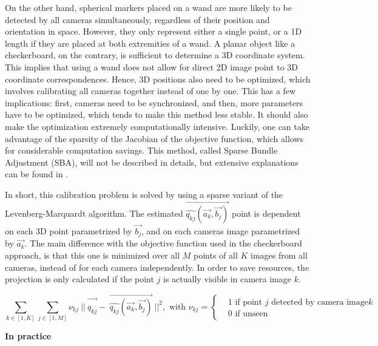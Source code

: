 On the other hand, spherical markers placed on a wand are more likely to be detected by all cameras simultaneously, regardless of their position and orientation in space. However, they only represent either a single point, or a 1D length if they are placed at both extremities of a wand. A planar object like a checkerboard, on the contrary, is sufficient to determine a 3D coordinate system. This implies that using a wand does not allow for direct 2D image point to 3D coordinate correspondences. Hence, 3D positions also need to be optimized, which involves calibrating all cameras together instead of one by one. This has a few implications: first, cameras need to be synchronized, and then, more parameters have to be optimized, which tends to make this method less stable. It should also make the optimization extremely computationally intensive. Luckily, one can take advantage of the sparsity of the Jacobian of the objective function, which allows for considerable computation savings. This method, called Sparse Bundle Adjustment (SBA), will not be described in details, but extensive explanations can be found in \cite{Lourakis2009}.

In short, this calibration problem is solved by using a sparse variant of the Levenberg-Marquardt algorithm.  The estimated $\overrightarrow{\widehat{q_{kj}}(\overrightarrow{a_k}, \overrightarrow{b_j})}$ point is dependent on each 3D point parametrized by $\overrightarrow{b_j}$, and on each cameras image parametrized by $\overrightarrow{a_k}$. The main difference with the objective function used in the checkerboard approach, is that this one is minimized over all $M$ points of all $K$ images from all cameras, instead of for each camera independently. In order to save resources, the projection is only calculated if the point $j$ is actually visible in camera image $k$.

\begin{equation}
  \sum_{k \in [1,K]} \sum_{j \in [1,M]} 
  \nu_{kj} \ ||\ \overrightarrow{q_{kj}^{\ ^{\ ^{\ ^{\ }}}}} - \ 
  \overrightarrow{\widehat{q_{kj}}(\overrightarrow{a_k}, \overrightarrow{b_j})}\ 
  ||^2,  
  \textrm{ with }  
  \nu_{kj} = 
    \begin{cases}
        & 1 \textrm{ if point } j \textrm{ detected by camera image} k \\
        & 0 \textrm{ if unseen}
    \end{cases}
\end{equation} 


\vspace*{0.5cm}
\noindent\textbf{In practice}  

